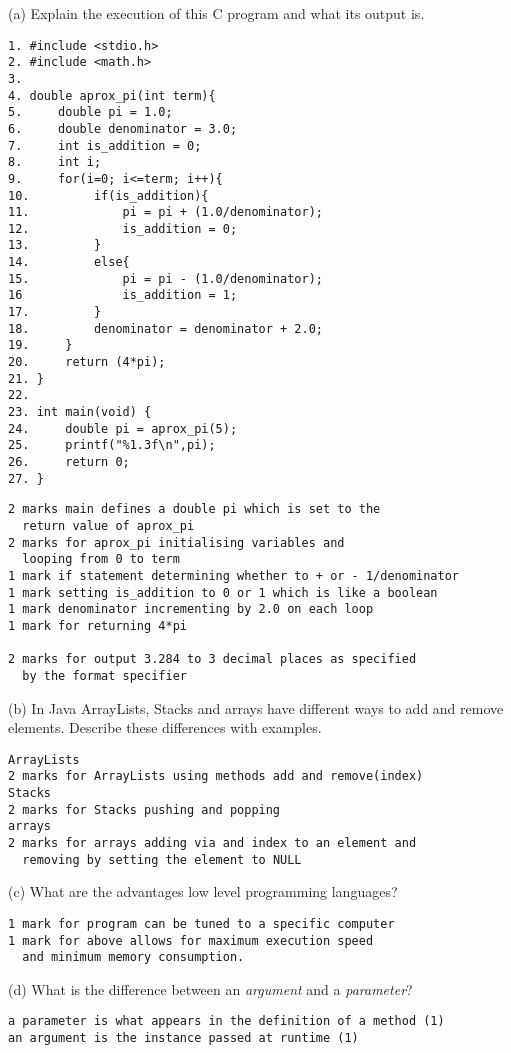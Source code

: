 \documentclass{exam}
\begin{document}
\begin{question}
\begin{roster}
\item[(a)]
Explain the execution of this C program and what its output is.
\begin{lstlisting}
1. #include <stdio.h>
2. #include <math.h>
3.
4. double aprox_pi(int term){
5.     double pi = 1.0;
6.     double denominator = 3.0;
7.     int is_addition = 0;
8.     int i;
9.     for(i=0; i<=term; i++){
10.         if(is_addition){
11.             pi = pi + (1.0/denominator);
12.             is_addition = 0;
13.         }
14.         else{
15.             pi = pi - (1.0/denominator);
16              is_addition = 1;
17.         }
18.         denominator = denominator + 2.0;
19.     }
20.     return (4*pi);
21. }
22. 
23. int main(void) {
24.     double pi = aprox_pi(5);
25.     printf("%1.3f\n",pi);
26.     return 0;
27. }
\end{lstlisting}
\color{red}
\begin{lstlisting}
2 marks main defines a double pi which is set to the 
  return value of aprox_pi
2 marks for aprox_pi initialising variables and 
  looping from 0 to term
1 mark if statement determining whether to + or - 1/denominator
1 mark setting is_addition to 0 or 1 which is like a boolean
1 mark denominator incrementing by 2.0 on each loop
1 mark for returning 4*pi

2 marks for output 3.284 to 3 decimal places as specified 
  by the format specifier
\end{lstlisting}
\color{black}

\item[(b)]
In Java ArrayLists, Stacks and arrays have different ways to add and remove elements.  Describe these differences with examples.
\color{red}
\begin{lstlisting}
ArrayLists
2 marks for ArrayLists using methods add and remove(index)
Stacks
2 marks for Stacks pushing and popping
arrays
2 marks for arrays adding via and index to an element and 
  removing by setting the element to NULL
\end{lstlisting}
\color{black}

\item[(c)]
What are the advantages low level programming languages?
\color{red}
\begin{lstlisting}
1 mark for program can be tuned to a specific computer 
1 mark for above allows for maximum execution speed 
  and minimum memory consumption.
\end{lstlisting}
\color{black}

\item[(d)]
What is the difference between an {\em argument} and a {\em parameter}?
\color{red}
\begin{lstlisting}
a parameter is what appears in the definition of a method (1)
an argument is the instance passed at runtime (1)
\end{lstlisting}
\color{black}
\end{roster}
\end{question}
\clearpage
{}
\end{document}
